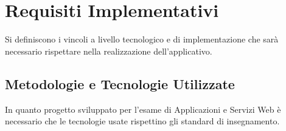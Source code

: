 	\section{Requisiti Implementativi}
	Si definiscono i vincoli a livello tecnologico e di implementazione che sarà necessario rispettare nella realizzazione dell'applicativo.
	
	\subsection{Metodologie e Tecnologie Utilizzate}
	In quanto progetto sviluppato per l'esame di Applicazioni e Servizi Web è necessario che le tecnologie usate rispettino gli standard di insegnamento. 
	